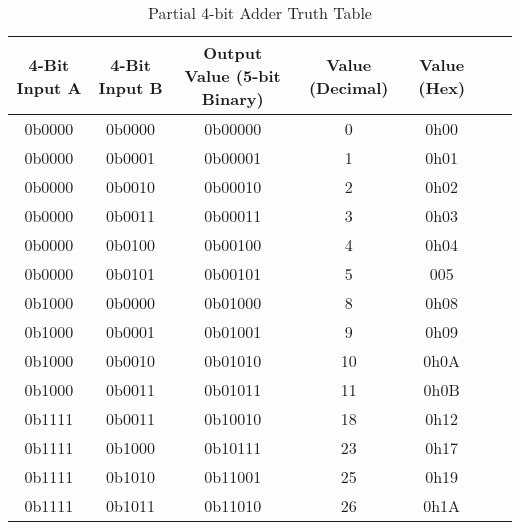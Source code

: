 \documentclass[11pt]{article}
\begin{document}
\begin{table}[H]
    \centering
    \begin{tabular}{|c|c|c|c|c|c|c|}
    \hline
    4-Bit Input A & 4-Bit Input B & Output Value (5-bit Binary) & Value (Decimal) & Value (Hex) \\
    \hline
    0b0000 & 0b0000 & 0b00000 & 0 & 0h00 \\ \hline
    0b0000 & 0b0001 & 0b00001 & 1 & 0h01 \\ \hline
    0b0000 & 0b0010 & 0b00010 & 2 & 0h02 \\ \hline
    0b0000 & 0b0011 & 0b00011 & 3 & 0h03 \\ \hline
    0b0000 & 0b0100 & 0b00100 & 4 & 0h04 \\ \hline
    0b0000 & 0b0101 & 0b00101 & 5 & 005 \\ \hline
    0b1000 & 0b0000 & 0b01000 & 8 & 0h08 \\ \hline
    0b1000 & 0b0001 & 0b01001 & 9 & 0h09 \\ \hline
    0b1000 & 0b0010 & 0b01010 & 10 & 0h0A \\ \hline
    0b1000 & 0b0011 & 0b01011 & 11 & 0h0B \\ \hline
    0b1111 & 0b0011 & 0b10010 & 18 & 0h12 \\ \hline
    0b1111 & 0b1000 & 0b10111 & 23 & 0h17 \\ \hline
    0b1111 & 0b1010 & 0b11001 & 25 & 0h19 \\ \hline
    0b1111 & 0b1011 & 0b11010 & 26 & 0h1A \\ \hline
    \end{tabular}
    \caption{Partial 4-bit Adder Truth Table}
    \label{tab:my_label}
\end{table}
\end{document}

